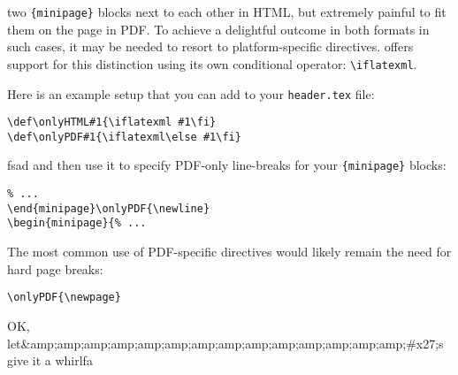 two \verb|{minipage}| blocks next to each other in HTML, but extremely painful to fit them on the page in PDF. To achieve a delightful outcome in both formats in such cases, it may be needed to resort to platform-specific directives. \latexml offers support for this distinction using its own conditional operator: \verb|\iflatexml|.

Here is an example setup that you can add to your \verb|header.tex| file:
\begin{lstlisting}
\def\onlyHTML#1{\iflatexml #1\fi}
\def\onlyPDF#1{\iflatexml\else #1\fi}
\end{lstlisting}
fsad
and then use it to specify PDF-only line-breaks for your \verb|{minipage}| blocks:
\begin{lstlisting}
% ...
\end{minipage}\onlyPDF{\newline}
\begin{minipage}{% ...
\end{lstlisting}

The most common use of PDF-specific directives would likely remain the need for hard page breaks:
\begin{lstlisting}
\onlyPDF{\newpage}
\end{lstlisting} OK, let&amp;amp;amp;amp;amp;amp;amp;amp;amp;amp;amp;amp;amp;amp;#x27;s give it a whirlfa